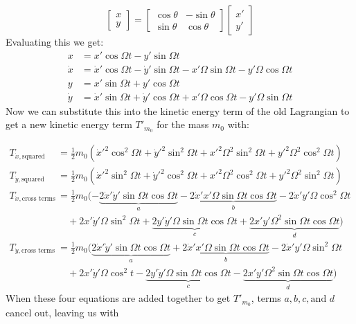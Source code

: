\documentclass[11pt]{article}
\begin{document}
\begin{equation}
    \begin{bmatrix}
        x \\ y
    \end{bmatrix}
    =
    \begin{bmatrix}
        \cos\theta & -\sin\theta \\
        \sin\theta & \cos\theta
    \end{bmatrix}
    \begin{bmatrix}
        x'\\y'
    \end{bmatrix}
\end{equation}
Evaluating this we get:
\begin{align}
    x &= x'\cos \Omega t - y'\sin \Omega t \\
    \dot x &= \dot x' \cos\Omega t - \dot y'\sin\Omega t - x'\Omega\sin\Omega t - y'\Omega\cos\Omega t \\
    y &= x'\sin\Omega t + y'\cos\Omega t \\
    \dot y &= \dot x' \sin\Omega t + \dot y'\cos\Omega t + x'\Omega\cos\Omega t - y'\Omega\sin\Omega t
\end{align}
\noindent
Now we can substitute this into the kinetic energy term of the old Lagrangian to get a new kinetic energy term $T'_{m_{0}}$ for the mass $m_{0}$ with:

\begin{align*}
    T_{\dot x, \text{squared terms}} & = \frac{1}{2}m_{0}(\dot x'^2 \cos^2 \Omega t + \dot y'^2\sin^2\Omega t + x'^2\Omega^2\sin^2\Omega t + y'^2\Omega^2\cos^2\Omega t)\\
    T_{\dot y, \text{squared terms}} & =\frac{1}{2}m_{0}(\dot x'^2\sin^2\Omega t + \dot y'^2\cos^2\Omega t + x'^2\Omega^2\cos^2\Omega t + y'^2\Omega^2\sin^2\Omega t) \\
    T_{\dot x, \text{cross terms}} & = \frac{1}{2}m_{0}(-\underbrace{2\dot x'\dot y'\sin\Omega t\cos\Omega t}_{a} - \underbrace{2\dot x'x'\Omega\sin\Omega t\cos\Omega t}_{b}-2\dot x' y'\Omega\cos^2\Omega t \\
    & \quad + 2x'\dot y' \Omega\sin^2\Omega t + \underbrace{2y'\dot y'\Omega\sin\Omega t\cos\Omega t}_{c} + \underbrace{2x'y'\Omega^2\sin\Omega t\cos\Omega t}_{d})\\
    T_{\dot y, \text{cross terms}} & = \frac{1}{2}m_{0}(\underbrace{2\dot x'\dot y'\sin\Omega t\cos\Omega t}_a + \underbrace{2\dot x'x'\Omega\sin\Omega t\cos\Omega t}_{b} - 2\dot x'y'\Omega \sin^2\Omega t \\
    & \quad + 2x'\dot y'\Omega\cos^2 t - \underbrace{2y'\dot y'\Omega\sin\Omega t\cos\Omega t}_{c} - \underbrace{2x'y'\Omega^2\sin\Omega t\cos\Omega t}_{d})
\end{align*}
When these four equations are added together to get $T'_{m_{0}}$, terms $a,b,c,\text{and }d$ cancel out, leaving us with
\end{document}
